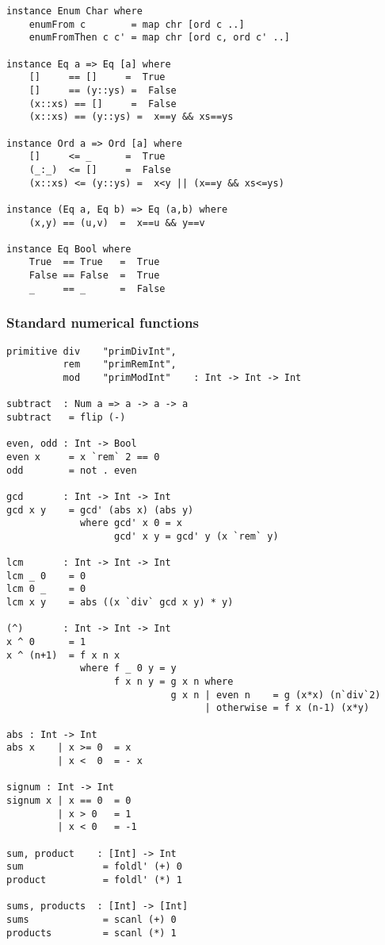 \begin{verbatim}
instance Enum Char where
    enumFrom c        = map chr [ord c ..]
    enumFromThen c c' = map chr [ord c, ord c' ..]

instance Eq a => Eq [a] where
    []     == []     =  True
    []     == (y::ys) =  False
    (x::xs) == []     =  False
    (x::xs) == (y::ys) =  x==y && xs==ys

instance Ord a => Ord [a] where
    []     <= _      =  True
    (_:_)  <= []     =  False
    (x::xs) <= (y::ys) =  x<y || (x==y && xs<=ys)

instance (Eq a, Eq b) => Eq (a,b) where
    (x,y) == (u,v)  =  x==u && y==v

instance Eq Bool where
    True  == True   =  True
    False == False  =  True
    _     == _      =  False
\end{verbatim}
\subsubsection*{Standard numerical functions}
\begin{verbatim}
primitive div    "primDivInt",
          rem    "primRemInt",
          mod    "primModInt"    : Int -> Int -> Int

subtract  : Num a => a -> a -> a
subtract   = flip (-)

even, odd : Int -> Bool
even x     = x `rem` 2 == 0
odd        = not . even

gcd       : Int -> Int -> Int
gcd x y    = gcd' (abs x) (abs y)
             where gcd' x 0 = x
                   gcd' x y = gcd' y (x `rem` y)

lcm       : Int -> Int -> Int
lcm _ 0    = 0
lcm 0 _    = 0
lcm x y    = abs ((x `div` gcd x y) * y)

(^)       : Int -> Int -> Int
x ^ 0      = 1
x ^ (n+1)  = f x n x
             where f _ 0 y = y
                   f x n y = g x n where
                             g x n | even n    = g (x*x) (n`div`2)
                                   | otherwise = f x (n-1) (x*y)

abs : Int -> Int
abs x    | x >= 0  = x
         | x <  0  = - x

signum : Int -> Int
signum x | x == 0  = 0
         | x > 0   = 1
         | x < 0   = -1

sum, product    : [Int] -> Int
sum              = foldl' (+) 0
product          = foldl' (*) 1

sums, products	: [Int] -> [Int]
sums             = scanl (+) 0
products         = scanl (*) 1
\end{verbatim}
